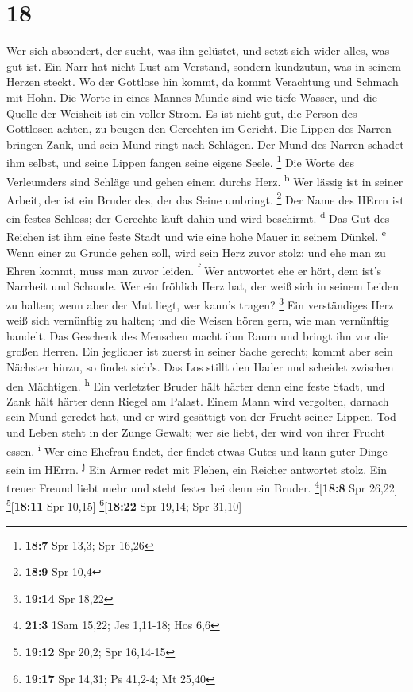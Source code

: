 \hypertarget{section-17}{%
\section{18}\label{section-17}}

 Wer sich absondert, der sucht, was ihn gelüstet, und
setzt sich wider alles, was gut ist.  Ein Narr hat nicht
Lust am Verstand, sondern kundzutun, was in seinem Herzen steckt.
 Wo der Gottlose hin kommt, da kommt Verachtung und
Schmach mit Hohn.  Die Worte in eines Mannes Munde sind
wie tiefe Wasser, und die Quelle der Weisheit ist ein voller Strom.
 Es ist nicht gut, die Person des Gottlosen achten, zu
beugen den Gerechten im Gericht.  Die Lippen des Narren
bringen Zank, und sein Mund ringt nach Schlägen.  Der Mund
des Narren schadet ihm selbst, und seine Lippen fangen seine eigene
Seele. \footnote{\textbf{18:7} Spr 13,3; Spr 16,26}  Die
Worte des Verleumders sind Schläge und gehen einem durchs Herz.
\textsuperscript{b}  Wer lässig ist in seiner Arbeit, der
ist ein Bruder des, der das Seine umbringt. \footnote{\textbf{18:9} Spr
  10,4}  Der Name des HErrn ist ein festes Schloss; der
Gerechte läuft dahin und wird beschirmt. \textsuperscript{d}
 Das Gut des Reichen ist ihm eine feste Stadt und wie
eine hohe Mauer in seinem Dünkel. \textsuperscript{e} 
Wenn einer zu Grunde gehen soll, wird sein Herz zuvor stolz; und ehe man
zu Ehren kommt, muss man zuvor leiden. \textsuperscript{f}
 Wer antwortet ehe er hört, dem ist's Narrheit und
Schande.  Wer ein fröhlich Herz hat, der weiß sich in
seinem Leiden zu halten; wenn aber der Mut liegt, wer kann's tragen?
\footnote{\textbf{19:14} Spr 18,22}  Ein verständiges
Herz weiß sich vernünftig zu halten; und die Weisen hören gern, wie man
vernünftig handelt.  Das Geschenk des Menschen macht ihm
Raum und bringt ihn vor die großen Herren.  Ein jeglicher
ist zuerst in seiner Sache gerecht; kommt aber sein Nächster hinzu, so
findet sich's.  Das Los stillt den Hader und scheidet
zwischen den Mächtigen. \textsuperscript{h}  Ein
verletzter Bruder hält härter denn eine feste Stadt, und Zank hält
härter denn Riegel am Palast.  Einem Mann wird vergolten,
darnach sein Mund geredet hat, und er wird gesättigt von der Frucht
seiner Lippen.  Tod und Leben steht in der Zunge Gewalt;
wer sie liebt, der wird von ihrer Frucht essen. \textsuperscript{i}
 Wer eine Ehefrau findet, der findet etwas Gutes und kann
guter Dinge sein im HErrn. \textsuperscript{j}  Ein Armer
redet mit Flehen, ein Reicher antwortet stolz.  Ein
treuer Freund liebt mehr und steht fester bei denn ein Bruder.
\footnote{\textbf{21:3} 1Sam 15,22; Jes 1,11-18; Hos 6,6}{[}\textbf{18:8}
Spr 26,22{]} \footnote{\textbf{19:12} Spr 20,2; Spr 16,14-15}{[}\textbf{18:11}
Spr 10,15{]} \footnote{\textbf{19:17} Spr 14,31; Ps 41,2-4; Mt 25,40}{[}\textbf{18:22}
Spr 19,14; Spr 31,10{]}

